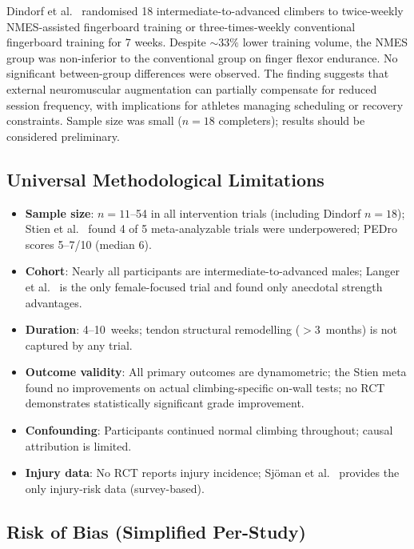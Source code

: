 \documentclass[12pt,a4paper]{article}
\begin{document}
\begin{evidencebox}
Dindorf et al.\ \cite{dindorf2024} randomised 18 intermediate-to-advanced climbers to twice-weekly NMES-assisted fingerboard training or three-times-weekly conventional fingerboard training for 7 weeks. Despite ${\sim}33\%$ lower training volume, the NMES group was non-inferior to the conventional group on finger flexor endurance. No significant between-group differences were observed. The finding suggests that external neuromuscular augmentation can partially compensate for reduced session frequency, with implications for athletes managing scheduling or recovery constraints. Sample size was small ($n = 18$ completers); results should be considered preliminary.
\end{evidencebox}

\subsection{Universal Methodological Limitations}

\begin{itemize}[noitemsep, topsep=2pt]
  \item \textbf{Sample size}: $n=11$--54 in all intervention trials (including Dindorf $n=18$); Stien et al.\ \cite{stien2023} found 4 of 5 meta-analyzable trials were underpowered; PEDro scores 5--7/10 (median 6).
  \item \textbf{Cohort}: Nearly all participants are intermediate-to-advanced males; Langer et al.\ \cite{langer2024} is the only female-focused trial and found only anecdotal strength advantages.
  \item \textbf{Duration}: 4--10~weeks; tendon structural remodelling ($>\!3$~months) is not captured by any trial.
  \item \textbf{Outcome validity}: All primary outcomes are dynamometric; the Stien meta found no improvements on actual climbing-specific on-wall tests; no RCT demonstrates statistically significant grade improvement.
  \item \textbf{Confounding}: Participants continued normal climbing throughout; causal attribution is limited.
  \item \textbf{Injury data}: No RCT reports injury incidence; Sjöman et al.\ \cite{sjoman2023} provides the only injury-risk data (survey-based).
\end{itemize}

\subsection*{Risk of Bias (Simplified Per-Study)}
\end{document}
